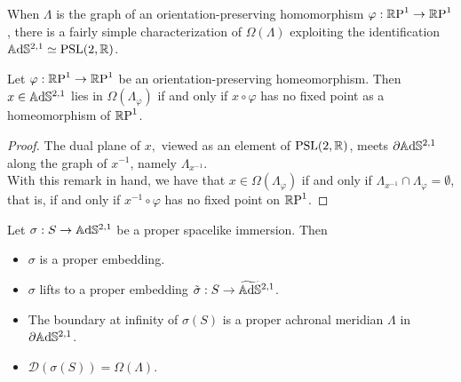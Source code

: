 When $\Lambda$ is the graph of an orientation-preserving homomorphism $\varphi:\S\to\S$, there is a fairly simple characterization of $\Omega(\Lambda)$ exploiting the identification $\A^{2,1}\simeq \PSL$.


\begin{corollary}\label{454}
    Let $\varphi:\S\to\S$ be an orientation-preserving homeomorphism. Then $x\in\A^{2,1}$ lies in $\Omega(\Lambda_\varphi)$ if and only if $x\circ\varphi$ has no fixed point as a homeomorphism of $\S$.
\end{corollary}
\begin{proof}
    The dual plane of $x,$ viewed as an element of $\PSL$, meets $\partial\A^{2,1}$ along the graph of $x^{-1}$, namely $\Lambda_{x^{-1}}$.\\
    With this remark in hand, we have that $x\in\Omega(\Lambda_\varphi)$ if and only if $\Lambda_{x^{-1}}\cap \Lambda_\varphi=\emptyset$, that is, if and only if $x^{-1}\circ\varphi$ has no fixed point on $\S$.

\end{proof}

\begin{proposition}
    Let $\sigma: S\to\A^{2,1}$ be a proper spacelike immersion. Then 
    \begin{itemize}
        \item $\sigma$ is a proper embedding.
        \item $\sigma$ lifts to a proper embedding $\tilde{\sigma}:S\to\AS^{2,1}$.
        \item The boundary at infinity of $\sigma(S)$ is a proper achronal meridian $\Lambda$ in $\partial\A^{2,1}$.
        \item $\mathcal{D}(\sigma(S))=\Omega(\Lambda).$
    \end{itemize}
\end{proposition}


